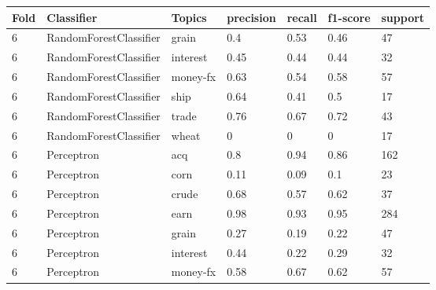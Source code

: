 \documentclass{article}
\begin{document}
\begin{table}[h]
\begin{tabular}{lllllll}
\textbf{Fold} & \textbf{Classifier}    & \textbf{Topics} & \textbf{precision} & \textbf{recall} & \textbf{f1-score} & \textbf{support} \\ \hline
6             & RandomForestClassifier & grain           & 0.4                & 0.53            & 0.46              & 47               \\
6             & RandomForestClassifier & interest        & 0.45               & 0.44            & 0.44              & 32               \\
6             & RandomForestClassifier & money-fx        & 0.63               & 0.54            & 0.58              & 57               \\
6             & RandomForestClassifier & ship            & 0.64               & 0.41            & 0.5               & 17               \\
6             & RandomForestClassifier & trade           & 0.76               & 0.67            & 0.72              & 43               \\
6             & RandomForestClassifier & wheat           & 0                  & 0               & 0                 & 17               \\
6             & Perceptron             & acq             & 0.8                & 0.94            & 0.86              & 162              \\
6             & Perceptron             & corn            & 0.11               & 0.09            & 0.1               & 23               \\
6             & Perceptron             & crude           & 0.68               & 0.57            & 0.62              & 37               \\
6             & Perceptron             & earn            & 0.98               & 0.93            & 0.95              & 284              \\
6             & Perceptron             & grain           & 0.27               & 0.19            & 0.22              & 47               \\
6             & Perceptron             & interest        & 0.44               & 0.22            & 0.29              & 32               \\
6             & Perceptron             & money-fx        & 0.58               & 0.67            & 0.62              & 57               \\

\end{tabular}
\end{table}
\end{document}
